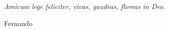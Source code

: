 \cleardoublepage

\null
\vfill
\thispagestyle{empty}



{\normalsize \it \hfill Amicum lege feliciter, vivas, gaudeas, floreas in Deo. \vspace*{4pt}


\hfill Fernando \vspace*{4pt}}

